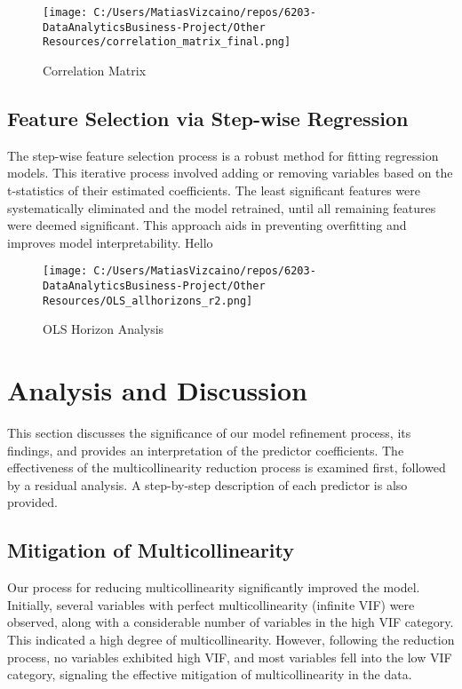 \documentclass{article}
\begin{document}
\begin{figure}[htbp]
  \centering
  \texttt{[image: C:/Users/MatiasVizcaino/repos/6203-DataAnalyticsBusiness-Project/Other Resources/correlation\_matrix\_final.png]}
  \caption{Correlation Matrix}
  \label{fig:correlation-matrix}
\end{figure}

\subsection{Feature Selection via Step-wise Regression}

The step-wise feature selection process is a robust method for fitting regression models. This iterative process involved adding or removing variables based on the t-statistics of their estimated coefficients. The least significant features were systematically eliminated and the model retrained, until all remaining features were deemed significant. This approach aids in preventing overfitting and improves model interpretability.
Hello
\begin{figure}[htbp]
  \centering
  \texttt{[image: C:/Users/MatiasVizcaino/repos/6203-DataAnalyticsBusiness-Project/Other Resources/OLS\_allhorizons\_r2.png]}
  \caption{OLS Horizon Analysis}
  \label{fig:ols-all-horizons}
\end{figure}

\section{Analysis and Discussion}

This section discusses the significance of our model refinement process, its findings, and provides an interpretation of the predictor coefficients. The effectiveness of the multicollinearity reduction process is examined first, followed by a residual analysis. A step-by-step description of each predictor is also provided.

\subsection{Mitigation of Multicollinearity}
Our process for reducing multicollinearity significantly improved the model. Initially, several variables with perfect multicollinearity (infinite VIF) were observed, along with a considerable number of variables in the high VIF category. This indicated a high degree of multicollinearity. However, following the reduction process, no variables exhibited high VIF, and most variables fell into the low VIF category, signaling the effective mitigation of multicollinearity in the data.
\end{document}
